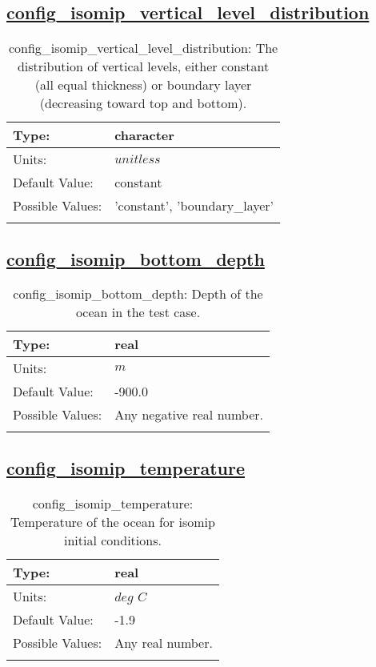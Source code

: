 \subsection[config\_isomip\_vertical\_level\_distribution]{\hyperref[sec:nm_tab_isomip]{config\_isomip\_vertical\_level\_distribution}}
\label{subsec:nm_sec_config_isomip_vertical_level_distribution}
\begin{center}
\begin{longtable}{| p{2.0in} || p{4.0in} |}
    \hline
    Type: & character \\
    \hline
    Units: & $unitless$ \\
    \hline
    Default Value: & constant \\
    \hline
    Possible Values: & 'constant', 'boundary\_layer' \\
    \hline
    \caption{config\_isomip\_vertical\_level\_distribution: The distribution of vertical levels, either constant (all equal thickness) or boundary layer (decreasing toward top and bottom).}
\end{longtable}
\end{center}
\subsection[config\_isomip\_bottom\_depth]{\hyperref[sec:nm_tab_isomip]{config\_isomip\_bottom\_depth}}
\label{subsec:nm_sec_config_isomip_bottom_depth}
\begin{center}
\begin{longtable}{| p{2.0in} || p{4.0in} |}
    \hline
    Type: & real \\
    \hline
    Units: & $m$ \\
    \hline
    Default Value: & -900.0 \\
    \hline
    Possible Values: & Any negative real number. \\
    \hline
    \caption{config\_isomip\_bottom\_depth: Depth of the ocean in the test case.}
\end{longtable}
\end{center}
\subsection[config\_isomip\_temperature]{\hyperref[sec:nm_tab_isomip]{config\_isomip\_temperature}}
\label{subsec:nm_sec_config_isomip_temperature}
\begin{center}
\begin{longtable}{| p{2.0in} || p{4.0in} |}
    \hline
    Type: & real \\
    \hline
    Units: & $deg$ $C$ \\
    \hline
    Default Value: & -1.9 \\
    \hline
    Possible Values: & Any real number. \\
    \hline
    \caption{config\_isomip\_temperature: Temperature of the ocean for isomip initial conditions.}
\end{longtable}
\end{center}
